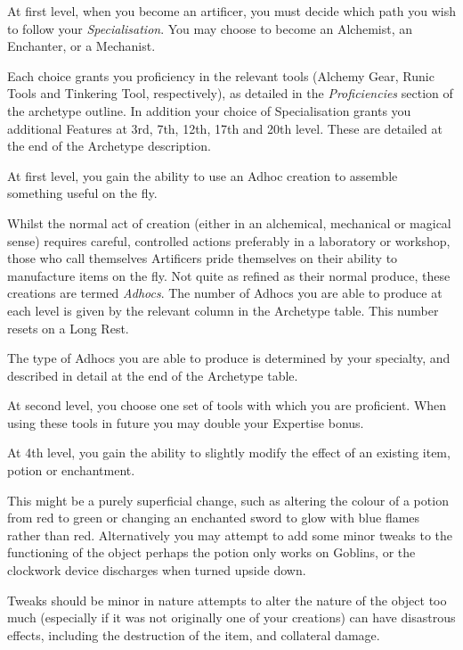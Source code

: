 {
	At first level, when you become an artificer, you must decide which path you wish to follow \minus{} your {\it Specialisation}. You may choose to become an Alchemist, an Enchanter, or a Mechanist. 
	
	Each choice grants you proficiency in the relevant tools (Alchemy Gear, Runic Tools and Tinkering Tool, respectively), as detailed in the {\it Proficiencies} section of the archetype outline. In addition your choice of Specialisation grants you additional Features at 3rd, 7th, 12th, 17th and 20th level. These are detailed at the end of the Archetype description. 
}

{
	At first level, you gain the ability to use an Ad\minus{}hoc creation to assemble something useful on the fly. 
	
	Whilst the normal act of creation (either in an alchemical, mechanical or magical sense) requires careful, controlled actions \minus{} preferably in a laboratory or workshop, those who call themselves Artificers pride themselves on their ability to manufacture items on the fly. Not quite as refined as their normal produce, these creations are termed {\it Ad\minus{}hocs}. The number of Ad\minus{}hocs you are able to produce at each level is given by the relevant column in the Archetype table. This number resets on a Long Rest. 
	
	The type of Ad\minus{}hocs you are able to produce is determined by your specialty, and described in detail at the end of the Archetype table. 	
}

{
	At second level, you choose one set of tools with which you are proficient. When using these tools in future you may double your Expertise bonus.  
}

{
	At 4th level, you gain the ability to slightly modify the effect of an existing item, potion or enchantment. 
	
	This might be a purely superficial change, such as altering the colour of a potion from red to green or changing an enchanted sword to glow with blue flames rather than red. Alternatively you may attempt to add some minor tweaks to the functioning of the object \minus{} perhaps the potion only works on Goblins, or the clockwork device discharges when turned upside down. 
	
	Tweaks should be minor in nature \minus{} attempts to alter the nature of the object too much (especially if it was not originally one of your creations) can have disastrous effects, including the destruction of the item, and collateral damage.  
}

